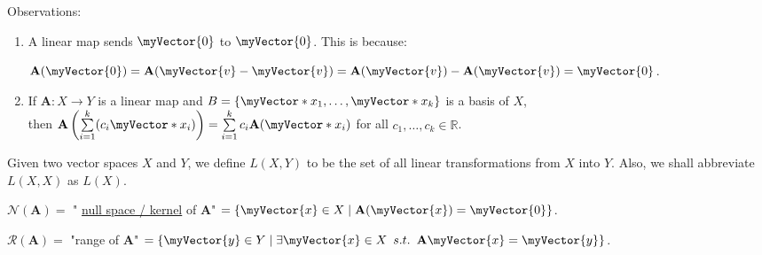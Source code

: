 \documentclass{book}
\newcommand{\exOne}{%
   \color{Purple}%
   \fontsize{14}{16}\selectfont%
}
\newenvironment{myIndent}{%
   \begin{adjustwidth}{2.5em}{0em}%
}{%
   \end{adjustwidth}%
}
\newcommand{\udefine}[1]{{%
   \setulcolor{Red}%
   \setul{0.14em}{0.07em}%
   \ul{#1}%
}}
\newcommand{\suchthat}{ \hspace{0.5em}s.t.\hspace{0.5em}}
\newcommand{\rangeSp}[1]{\mathscr{R}(#1)}
\newcommand{\nullSp}[1]{\mathscr{N}(#1)}
\newcommand{\retTwo}{\hfill\bigbreak}
\newcommand{\mVec}[1]{\myVector{#1}}
\newcommand{\mVecAst}[1]{\myVector*{#1}}
\newcommand{\mMat}[1]{\mathbf{#1}}
\begin{document}
{\begin{myIndent}\exOne
   Observations:
   \begin{enumerate}
      \item A linear map sends $\mVec{0}$ to $\mVec{0}$. This is because: 
      
      {\centering$\mMat{A}(\mVec{0}) = \mMat{A}(\mVec{v} - \mVec{v}) = \mMat{A}(\mVec{v}) - \mMat{A}(\mVec{v}) = \mVec{0}$.\retTwo\par}

      \item If $\mMat{A}: X \longrightarrow Y$ is a linear map and $B = \{\mVecAst{x}_1, \ldots, \mVecAst{x}_k\}$ is a basis of $X$,\\
      then $\mMat{A}\left(\sum\limits_{i=1}^k(c_i\mVecAst{x}_i)\right) = \sum\limits_{i=1}^kc_i\mMat{A}(\mVecAst{x}_i)$ for all $c_1, \ldots, c_k \in \mathbb{R}$.\retTwo
   \end{enumerate}
\end{myIndent}}

Given two vector spaces $X$ and $Y$, we define $L(X, Y)$ to be the set of all linear transformations from $X$ into $Y$. Also, we shall abbreviate $L(X, X)$ as $L(X)$.\retTwo

$\nullSp{\mMat{A}} = $ "\udefine{null space / kernel} of $\mMat{A}$" $ = \{\mVec{x} \in X \mid \mMat{A}(\mVec{x}) = \mVec{0}\}$.\retTwo

$\rangeSp{\mMat{A}} =$ "range of $\mMat{A}$" $ = \{\mVec{y} \in Y \mid \exists \mVec{x} \in X \suchthat \mMat{A}\mVec{x} = \mVec{y}\}$.\retTwo
\end{document}
